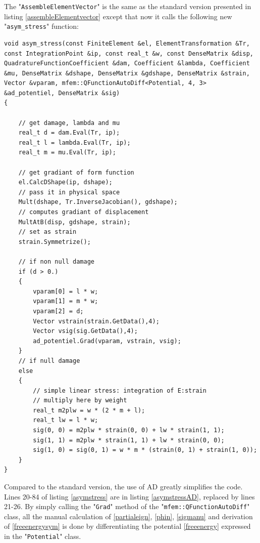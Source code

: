 \documentclass[12pt]{article}
\newcommand{\mycode}[1]{\textsf{"}\lstinline`#1`\textsf{"}}
\begin{document}
\bigskip 
The \mycode{AssembleElementVector} is the same as the standard version presented in listing \ref{assembleElementvector} except that now it calls the following new \mycode{asym_stress} function:
\begin{lstlisting}[basicstyle=\scriptsize,label=asymstressAD]
void asym_stress(const FiniteElement &el, ElementTransformation &Tr, const IntegrationPoint &ip, const real_t &w, const DenseMatrix &disp, QuadratureFunctionCoefficient &dam, Coefficient &lambda, Coefficient &mu, DenseMatrix &dshape, DenseMatrix &gdshape, DenseMatrix &strain, Vector &vparam, mfem::QFunctionAutoDiff<Potential, 4, 3> &ad_potentiel, DenseMatrix &sig)
{
	
	// get damage, lambda and mu
	real_t d = dam.Eval(Tr, ip);
	real_t l = lambda.Eval(Tr, ip);
	real_t m = mu.Eval(Tr, ip);
	
	// get gradiant of form function
	el.CalcDShape(ip, dshape);
	// pass it in physical space
	Mult(dshape, Tr.InverseJacobian(), gdshape);
	// computes gradiant of displacement
	MultAtB(disp, gdshape, strain);
	// set as strain
	strain.Symmetrize();
	
	// if non null damage
	if (d > 0.)
	{
		vparam[0] = l * w;
		vparam[1] = m * w;
		vparam[2] = d;
		Vector vstrain(strain.GetData(),4);
		Vector vsig(sig.GetData(),4);
		ad_potentiel.Grad(vparam, vstrain, vsig);
	}
	// if null damage
	else
	{
		// simple linear stress: integration of E:strain
		// multiply here by weight
		real_t m2plw = w * (2 * m + l);
		real_t lw = l * w;
		sig(0, 0) = m2plw * strain(0, 0) + lw * strain(1, 1);
		sig(1, 1) = m2plw * strain(1, 1) + lw * strain(0, 0);
		sig(1, 0) = sig(0, 1) = w * m * (strain(0, 1) + strain(1, 0));
	}
}
\end{lstlisting}
Compared to the standard version, the use of AD greatly simplifies the code.
Lines 20-84 of listing \ref{asymstress} are in listing \ref{asymstressAD}, replaced by lines 21-26.
By simply calling the \mycode{Grad} method of the \mycode{mfem::QFunctionAutoDiff} class, all the manual calculation of \eqref{partialeign}, \eqref{phin}, \eqref{sigmanu} and derivation of \eqref{freeenergysym} is done by differentiating the potential \eqref{freeenergy} expressed in the \mycode{Potential} class.
\end{document}

